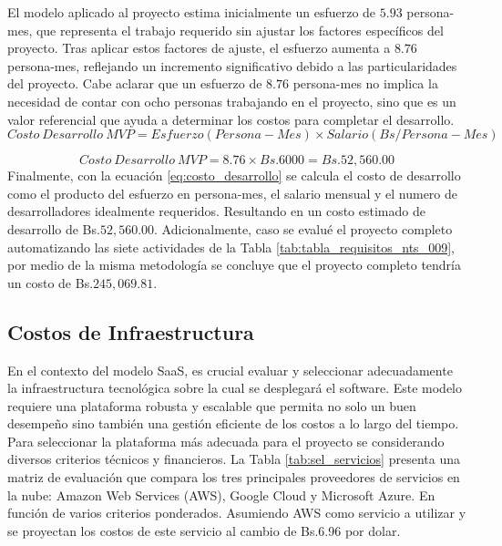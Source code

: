 El modelo aplicado al proyecto estima inicialmente un esfuerzo de $5.93$ persona-mes, que representa el trabajo requerido sin ajustar los factores específicos del proyecto. Tras aplicar estos factores de ajuste, el esfuerzo aumenta a $8.76$ persona-mes, reflejando un incremento significativo debido a las particularidades del proyecto. Cabe aclarar que un esfuerzo de $8.76$ persona-mes no implica la necesidad de contar con ocho personas trabajando en el proyecto, sino que es un valor referencial que ayuda a determinar los costos para completar el desarrollo.
\begin{equation}\label{eq:costo_desarrollo}
    Costo\ Desarrollo\ MVP = Esfuerzo(Persona-Mes) \times Salario(Bs/Persona-Mes)
\end{equation}

\begin{equation*}
    Costo\ Desarrollo\ MVP = 8.76 \times Bs.6000 = Bs.52,560.00
\end{equation*}
Finalmente, con la ecuación \ref{eq:costo_desarrollo} se calcula el costo de desarrollo como el producto del esfuerzo en persona-mes, el salario mensual y el numero de desarrolladores idealmente requeridos. Resultando en un costo estimado de desarrollo de Bs.$52,560.00$. Adicionalmente, caso se evalué el proyecto completo automatizando las siete actividades de la Tabla \ref{tab:tabla_requisitos_nts_009}, por medio de la misma metodología se concluye que el proyecto completo tendría un costo de Bs.$245,069.81$.

\subsection{Costos de Infraestructura}

En el contexto del modelo SaaS, es crucial evaluar y seleccionar adecuadamente la infraestructura tecnológica sobre la cual se desplegará el software. Este modelo requiere una plataforma robusta y escalable que permita no solo un buen desempeño sino también una gestión eficiente de los costos a lo largo del tiempo. Para seleccionar la plataforma más adecuada para el proyecto se considerando diversos criterios técnicos y financieros. La Tabla \ref{tab:sel_servicios} presenta una matriz de evaluación que compara los tres principales proveedores de servicios en la nube: Amazon Web Services (AWS), Google Cloud y Microsoft Azure. En función de varios criterios ponderados. Asumiendo AWS como servicio a utilizar y se proyectan los costos de este servicio al cambio de Bs.6.96 por dolar.

